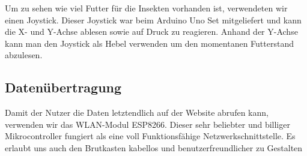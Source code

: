 Um zu sehen wie viel Futter für die Insekten vorhanden ist, verwendeten wir einen Joystick. Dieser Joystick war beim Arduino Uno Set mitgeliefert und kann die X- und Y-Achse ablesen sowie auf Druck zu reagieren. Anhand der Y-Achse kann man den Joystick als Hebel verwenden um den momentanen Futterstand abzulesen. 


\subsection{Datenübertragung}

Damit der Nutzer die Daten letztendlich auf der Website abrufen kann, verwenden wir das WLAN-Modul ESP8266. Dieser sehr beliebter und billiger Mikrocontroller fungiert als eine voll Funktionsfähige Netzwerkschnittstelle. Es erlaubt uns auch den Brutkasten kabellos und benutzerfreundlicher zu Gestalten

